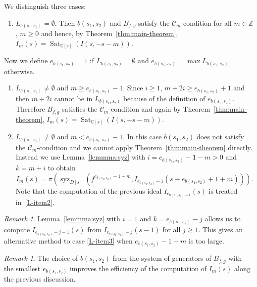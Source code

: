 \documentclass[a4paper,12pt]{amsart}
\theoremstyle{plain}
\theoremstyle{definition}
\theoremstyle{remark}
\newtheorem{remark}[theorem]{Remark}
\def\CC{\mathbb{C}}
\def\ZZ{\mathbb{Z}}
\DeclareMathOperator{\Sat}{Sat}
\DeclareMathOperator{\syz}{syz}
\begin{document}
We distinguish three cases:

\begin{enumerate}
\renewcommand{\theenumi}{\alph{enumi}}
\item \label{L-item1} $L_{b(s_1,s_2)} = \emptyset$. Then $b(s_1,s_2)$ and $B_{f,g}$ satisfy the $\mathcal{C}_m$-condition for all $m \in \ZZ$, $m \geq 0$ and hence, by Theorem~\ref{thm:main-theorem}, $I_m(s)=\Sat_{\CC[s]}(I(s,-s-m))$.
\end{enumerate}
Now we define $e_{b(s_1,s_2)} = 1$ if $L_{b(s_1,s_2)} = \emptyset$ and $e_{b(s_1,s_2)} = \max L_{b(s_1,s_2)}$
otherwise.
\begin{enumerate}
\renewcommand{\theenumi}{\alph{enumi}}
\setcounter{enumi}{1}
\item \label{L-item2} $L_{b(s_1,s_2)} \neq \emptyset$ and $m \geq e_{b(s_1,s_2)} - 1$. Since $i \geq 1$, $m+2i \geq e_{b(s_1,s_2)} + 1$ and then
$m+2i$ cannot be in $L_{b(s_1,s_2)}$ because of the definition of $e_{b(s_1,s_2)}$. Therefore $B_{f,g}$ satisfies
the $\mathcal{C}_m$-condition and again by Theorem~\ref{thm:main-theorem}, $I_m(s)=\Sat_{\CC[s]}(I(s,-s-m))$.
\item \label{L-item3} $L_{b(s_1,s_2)} \neq \emptyset$ and $m < e_{b(s_1,s_2)} - 1$. In this case $b(s_1,s_2)$ does not satisfy
the $\mathcal{C}_m$-condition and we cannot apply Theorem~\ref{thm:main-theorem} directly.
Instead we use Lemma~\ref{lemmma:syz} with $i = e_{b(s_1,s_2)}-1-m > 0$ and $k = m+i$ to obtain
\begin{equation*}%
I_{m}(s) = \pi(\syz_{D[s]}(f^{e_{b(s_1,s_2)}-1-m},I_{e_{b(s_1,s_2)}-1}(s-e_{b(s_1,s_2)}+1+m))).
\end{equation*}
Note that the computation of the previous ideal $I_{e_{b(s_1,s_2)-1}}(s)$ is treated in~\eqref{L-item2}.
\end{enumerate}

\begin{remark}\label{rk:one-step}
Lemma~\ref{lemmma:syz} with $i=1$ and $k = e_{b(s_1,s_2)}-j$ allows us to compute $I_{e_{b(s_1,s_2)}-j-1}(s)$ from
$I_{e_{b(s_1,s_2)}-j}(s-1)$ for all $j \geq 1$. This gives an alternative method to case \eqref{L-item3} when
$e_{b(s_1,s_2)}-1-m$ is too large.
\end{remark}

\begin{remark}\label{rk:choice-b}
The choice of $b(s_1,s_2)$ from the system of generators of $B_{f,g}$ with the smallest $e_{b(s_1,s_2)}$
improves the efficiency of the computation of $I_m(s)$ along the previous discussion.
\end{remark}
\end{document}
